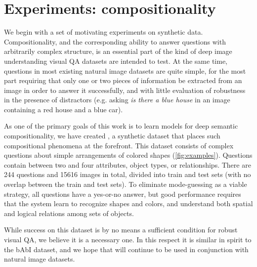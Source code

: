 \section{Experiments: compositionality}

We begin with a set of motivating experiments on synthetic data.
Compositionality, and the corresponding ability to answer questions with
arbitrarily complex structure, is an essential part of the kind of deep image
understanding visual QA datasets are intended to test. At the same time,
questions in most existing natural image datasets are quite simple, for the most
part requiring that only one or two pieces of information be extracted from an
image in order to answer it successfully, and with little evaluation of
robustness in the presence of distractors (e.g. asking \emph{is there a blue
house} in an image containing a red house and a blue car).

As one of the primary goals of this work is to learn models for deep semantic
compositionality, we have created \shapes, a synthetic dataset that places such
compositional phenomena at the forefront. This dataset consists of complex
questions about simple arrangements of colored shapes (\autoref{fig:examples}).  Questions contain
between two and four attributes, object types, or relationships.  There are 244
questions and 15616 images in total, divided into train and test sets (with no
overlap between the train and test sets). To eliminate mode-guessing as a
viable strategy, all questions have a yes-or-no answer, but good performance
requires that the system learn to recognize shapes and colors, and understand
both spatial and logical relations among sets of objects.

While success on this dataset is by no means a sufficient condition for robust
visual QA, we believe it is a necessary one. In this respect it is similar in
spirit to the bAbI \cite{Weston15BABI} dataset, and we hope that \shapes will
continue to be used in conjunction with natural image datasets.



